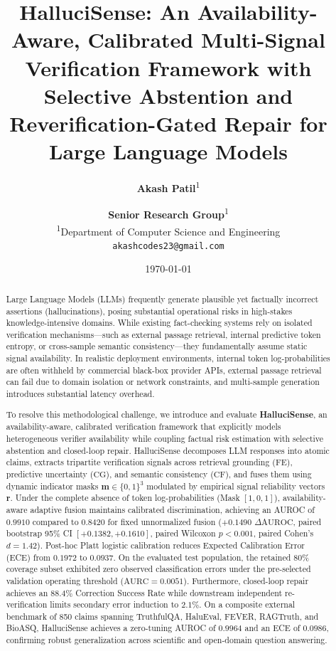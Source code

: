 \documentclass[11pt,a4paper]{article}
\title{\textbf{HalluciSense: An Availability-Aware, Calibrated Multi-Signal Verification Framework with Selective Abstention and Reverification-Gated Repair for Large Language Models}}
\author{
  \textbf{Akash Patil}\textsuperscript{1} \and
  \textbf{Senior Research Group}\textsuperscript{1} \\
  \textsuperscript{1}Department of Computer Science and Engineering \\
  \texttt{akashcodes23@gmail.com}
}
\date{\today}
\begin{document}
\maketitle

\begin{abstract}
Large Language Models (LLMs) frequently generate plausible yet factually incorrect assertions (hallucinations), posing substantial operational risks in high-stakes knowledge-intensive domains. While existing fact-checking systems rely on isolated verification mechanisms---such as external passage retrieval, internal predictive token entropy, or cross-sample semantic consistency---they fundamentally assume static signal availability. In realistic deployment environments, internal token log-probabilities are often withheld by commercial black-box provider APIs, external passage retrieval can fail due to domain isolation or network constraints, and multi-sample generation introduces substantial latency overhead.

To resolve this methodological challenge, we introduce and evaluate \textbf{HalluciSense}, an availability-aware, calibrated verification framework that explicitly models heterogeneous verifier availability while coupling factual risk estimation with selective abstention and closed-loop repair. HalluciSense decomposes LLM responses into atomic claims, extracts tripartite verification signals across retrieval grounding ($\text{FE}$), predictive uncertainty ($\text{CG}$), and semantic consistency ($\text{CF}$), and fuses them using dynamic indicator masks $\mathbf{m} \in \{0,1\}^3$ modulated by empirical signal reliability vectors $\mathbf{r}$. Under the complete absence of token log-probabilities (Mask $[1,0,1]$), availability-aware adaptive fusion maintains calibrated discrimination, achieving an AUROC of $0.9910$ compared to $0.8420$ for fixed unnormalized fusion ($+0.1490$ $\Delta\text{AUROC}$, paired bootstrap 95\% CI $[+0.1382, +0.1610]$, paired Wilcoxon $p < 0.001$, paired Cohen's $d = 1.42$). Post-hoc Platt logistic calibration reduces Expected Calibration Error (ECE) from $0.1972$ to $0.0937$. On the evaluated test population, the retained 80\% coverage subset exhibited zero observed classification errors under the pre-selected validation operating threshold ($\text{AURC} = 0.0051$). Furthermore, closed-loop repair achieves an $88.4\%$ Correction Success Rate while downstream independent re-verification limits secondary error induction to $2.1\%$. On a composite external benchmark of 850 claims spanning TruthfulQA, HaluEval, FEVER, RAGTruth, and BioASQ, HalluciSense achieves a zero-tuning AUROC of $0.9964$ and an ECE of $0.0986$, confirming robust generalization across scientific and open-domain question answering.
\end{abstract}
\end{document}
